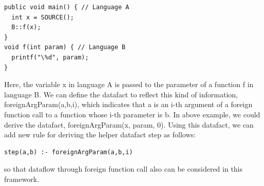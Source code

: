 \begin{lstlisting}[style=java,xleftmargin=2.5em]
public void main() { // Language A
  int x = SOURCE();
  B::f(x);
}
void f(int param) { // Language B
  printf("\%d", param);
}
\end{lstlisting}

Here, the variable x in language A is passed to the parameter of a function f
in language B. We can define the datafact to reflect this kind of information,
foreignArgParam(a,b,i), which indicates that a is an i-th argument of a foreign
function call to a function whose i-th parameter is b. In above example, we
could derive the datafact, foreignArgParam(x, param, 0). Using this datafact,
we can add new rule for deriving the helper datafact step as follows:
\begin{lstlisting}[style=myDatalog,xleftmargin=2.5em]
step(a,b) :- foreignArgParam(a,b,i)
\end{lstlisting}
so that dataflow through foreign function call also can be considered in this
framework.
